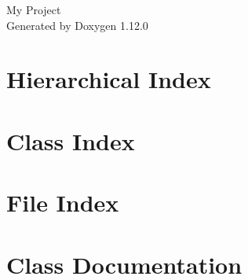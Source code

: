 \documentclass[twoside]{book}
\newcommand{\+}{\discretionary{\mbox{\scriptsize$\hookleftarrow$}}{}{}}
\newcommand{\clearemptydoublepage}{%
    \newpage{\pagestyle{empty}\cleardoublepage}%
  }
\begin{document}
  \raggedbottom
    \hypersetup{pageanchor=false,
                bookmarksnumbered=true,
                pdfencoding=unicode
               }
  \begin{titlepage}
  \vspace*{7cm}
  \begin{center}%
  {\Large My Project}\\
  \vspace*{1cm}
  {\large Generated by Doxygen 1.12.0}\\
  \end{center}
  \end{titlepage}
  \clearemptydoublepage
  \tableofcontents
  \clearemptydoublepage
  \hypersetup{pageanchor=true}
\chapter{Hierarchical Index}

\chapter{Class Index}

\chapter{File Index}

\chapter{Class Documentation}
























\end{document}
